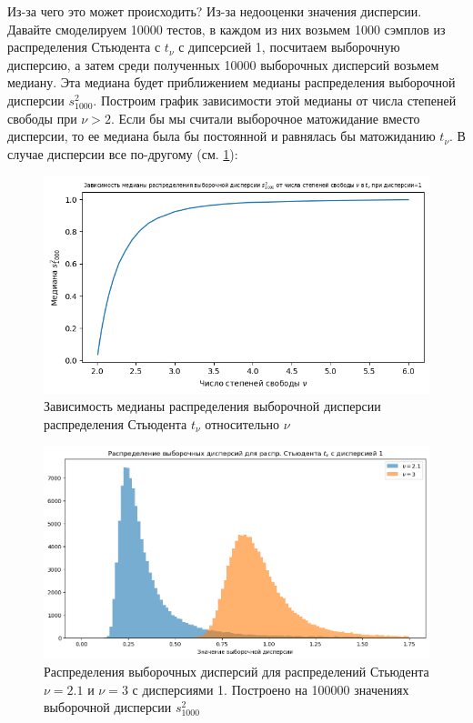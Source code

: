\documentclass{article}
\begin{document}
Из-за чего это может происходить? Из-за недооценки значения дисперсии. Давайте смоделируем 10000 тестов, в каждом из них возьмем 1000 сэмплов из распределения Стьюдента с $t_{\nu}$ с дипсерсией 1, посчитаем выборочную дисперсию, а затем среди полученных 10000 выборочных дисперсий возьмем медиану. Эта медиана будет приближением медианы распределения выборочной дисперсии $s_{1000}^2$. Построим график зависимости этой медианы от числа степеней свободы при $\nu > 2$. Если бы мы считали выборочное матожидание вместо дисперсии, то ее медиана была бы постоянной и равнялась бы матожиданию $t_{\nu}$. В случае дисперсии все по-другому (см. \ref{fig:median_depend_on_df}):

\begin{figure}[ht!] %
\centering
\includegraphics[width=5in]{theory_tester/theory_images/median_depend_on_df.png}
\caption{Зависимость медианы распределения выборочной дисперсии распределения Стьюдента $t_{\nu}$ относительно $\nu$}
\label{fig:median_depend_on_df}
\end{figure}

\begin{figure}[ht!] %
\centering
\includegraphics[width=5in]{theory_tester/theory_images/distributions_of_sample_variances.png}
\caption{Распределения выборочных дисперсий для распределений Стьюдента $\nu=2.1$ и $\nu=3$ с дисперсиями 1. Построено на 100000 значениях выборочной дисперсии $s_{1000}^2$}
\label{fig:distributions_of_sample_variances}
\end{figure}
\end{document}
